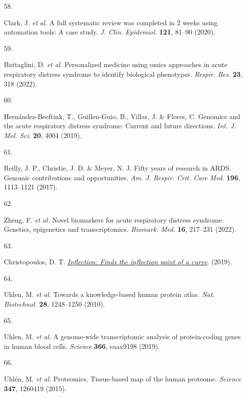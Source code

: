 \documentclass[
  11,
  a4paper,
]{article}
\newlength{\cslhangindent}
\newlength{\csllabelwidth}
\newlength{\cslentryspacingunit} %
\newenvironment{CSLReferences}[2] %
 {%
  \setlength{\parindent}{0pt}
  \ifodd #1
  \let\oldpar\par
  \def\par{\hangindent=\cslhangindent\oldpar}
  \fi
  \setlength{\parskip}{#2\cslentryspacingunit}
 }%
 {}
\newcommand{\CSLLeftMargin}[1]{\parbox[t]{\csllabelwidth}{#1}}
\newcommand{\CSLRightInline}[1]{\parbox[t]{\linewidth - \csllabelwidth}{#1}\break}
\begin{document}
\begin{CSLReferences}{0}{0}
\leavevmode{}%
\CSLLeftMargin{58. }%
\CSLRightInline{Clark, J. \emph{et al.} A full systematic review was
completed in 2 weeks using automation tools: A case study. \emph{J.
Clin. Epidemiol.} \textbf{121}, 81--90 (2020).}

\leavevmode{}%
\CSLLeftMargin{59. }%
\CSLRightInline{Battaglini, D. \emph{et al.} Personalized medicine using
omics approaches in acute respiratory distress syndrome to identify
biological phenotypes. \emph{Respir. Res.} \textbf{23}, 318 (2022).}

\leavevmode{}%
\CSLLeftMargin{60. }%
\CSLRightInline{Hernández-Beeftink, T., Guillen-Guio, B., Villar, J. \&
Flores, C. Genomics and the acute respiratory distress syndrome: Current
and future directions. \emph{Int. J. Mol. Sci.} \textbf{20}, 4004
(2019).}

\leavevmode{}%
\CSLLeftMargin{61. }%
\CSLRightInline{Reilly, J. P., Christie, J. D. \& Meyer, N. J. Fifty
years of research in {ARDS}. Genomic contributions and opportunities.
\emph{Am. J. Respir. Crit. Care Med.} \textbf{196}, 1113--1121 (2017).}

\leavevmode{}%
\CSLLeftMargin{62. }%
\CSLRightInline{Zheng, F. \emph{et al.} Novel biomarkers for acute
respiratory distress syndrome: Genetics, epigenetics and
transcriptomics. \emph{Biomark. Med.} \textbf{16}, 217--231 (2022).}

\leavevmode{}%
\CSLLeftMargin{63. }%
\CSLRightInline{Christopoulos, D. T.
\emph{\href{https://CRAN.R-project.org/package=inflection}{Inflection:
Finds the inflection point of a curve}}. (2019).}

\leavevmode{}%
\CSLLeftMargin{64. }%
\CSLRightInline{Uhlen, M. \emph{et al.} Towards a knowledge-based human
protein atlas. \emph{Nat. Biotechnol.} \textbf{28}, 1248--1250 (2010).}

\leavevmode{}%
\CSLLeftMargin{65. }%
\CSLRightInline{Uhlen, M. \emph{et al.} A genome-wide transcriptomic
analysis of protein-coding genes in human blood cells. \emph{Science}
\textbf{366}, eaax9198 (2019).}

\leavevmode{}%
\CSLLeftMargin{66. }%
\CSLRightInline{Uhlén, M. \emph{et al.} Proteomics. Tissue-based map of
the human proteome. \emph{Science} \textbf{347}, 1260419 (2015).}


\end{CSLReferences}
\end{document}
